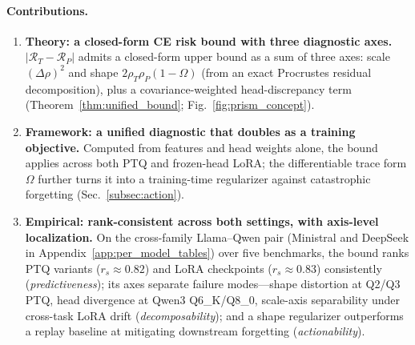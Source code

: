 \paragraph{Contributions.}
\begin{enumerate}[leftmargin=*,nosep,topsep=2pt]
    \item \textbf{Theory: a closed-form CE risk bound with three diagnostic axes.} $|\mathcal{R}_T - \mathcal{R}_P|$ admits a closed-form upper bound as a sum of three axes: scale $(\Delta\rho)^2$ and shape $2\rho_T\rho_P(1{-}\Omega)$ (from an exact Procrustes residual decomposition), plus a covariance-weighted head-discrepancy term (Theorem~\ref{thm:unified_bound}; Fig.~\ref{fig:prism_concept}).

    \item \textbf{Framework: a unified diagnostic that doubles as a training objective.} Computed from features and head weights alone, the bound applies across both PTQ and frozen-head LoRA; the differentiable trace form $\Omega$ further turns it into a training-time regularizer against catastrophic forgetting (Sec.~\ref{subsec:action}).

    \item \textbf{Empirical: rank-consistent across both settings, with axis-level localization.} On the cross-family Llama--Qwen pair (Ministral and DeepSeek in Appendix~\ref{app:per_model_tables}) over five benchmarks, the bound ranks PTQ variants ($r_s{\approx}0.82$) and LoRA checkpoints ($r_s{\approx}0.83$) consistently (\emph{predictiveness}); its axes separate failure modes---shape distortion at Q2/Q3 PTQ, head divergence at Qwen3 Q6\_K/Q8\_0, scale-axis separability under cross-task LoRA drift (\emph{decomposability}); and a shape regularizer outperforms a replay baseline at mitigating downstream forgetting (\emph{actionability}).
\end{enumerate}
